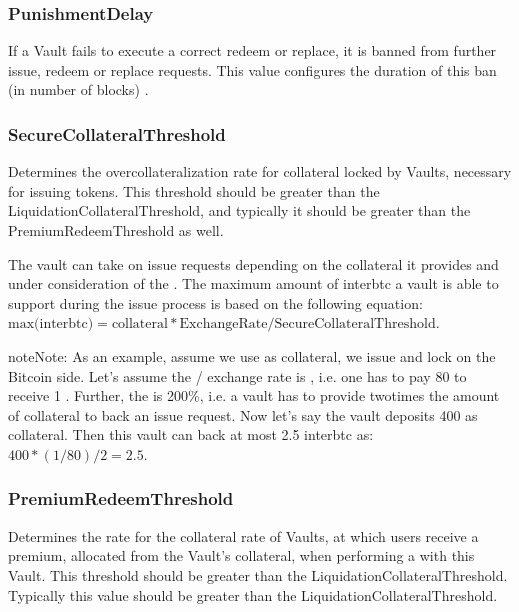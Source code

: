 \documentclass[a4paper,10pt,english]{sphinxmanual}
\begin{document}
\subsubsection{PunishmentDelay}
\label{\detokenize{spec/vault-registry:punishmentdelay}}
If a Vault fails to execute a correct redeem or replace, it is  banned from further issue, redeem or replace requests. This value configures the duration of this ban (in number of blocks) .


\subsubsection{SecureCollateralThreshold}
\label{\detokenize{spec/vault-registry:securecollateralthreshold}}\label{\detokenize{spec/vault-registry:id2}}
Determines the over\sphinxhyphen{}collateralization rate for collateral locked by Vaults, necessary for issuing tokens. This threshold should be greater than the LiquidationCollateralThreshold, and typically it should be greater than the PremiumRedeemThreshold as well.

The vault can take on issue requests depending on the collateral it provides and under consideration of the .
The maximum amount of interbtc a vault is able to support during the issue process is based on the following equation:
\(\text{max(interbtc)} = \text{collateral} * \text{ExchangeRate} / \text{SecureCollateralThreshold}\).

\begin{sphinxadmonition}{note}{Note:}
As an example, assume we use  as collateral, we issue  and lock  on the Bitcoin side. Let’s assume the / exchange rate is , i.e. one has to pay 80  to receive 1 . Further, the  is 200\%, i.e. a vault has to provide two\sphinxhyphen{}times the amount of collateral to back an issue request. Now let’s say the vault deposits 400  as collateral. Then this vault can back at most 2.5 interbtc as: \(400 * (1/80) / 2 = 2.5\).
\end{sphinxadmonition}


\subsubsection{PremiumRedeemThreshold}
\label{\detokenize{spec/vault-registry:premiumredeemthreshold}}\label{\detokenize{spec/vault-registry:premiumcollateralthreshold}}
Determines the rate for the collateral rate of Vaults, at which users receive a premium, allocated from the Vault’s collateral, when performing a {\hyperref[\detokenize{spec/redeem:redeem-protocol}]{}} with this Vault. This threshold should be greater than the LiquidationCollateralThreshold. Typically this value should be greater than the LiquidationCollateralThreshold.
\end{document}
